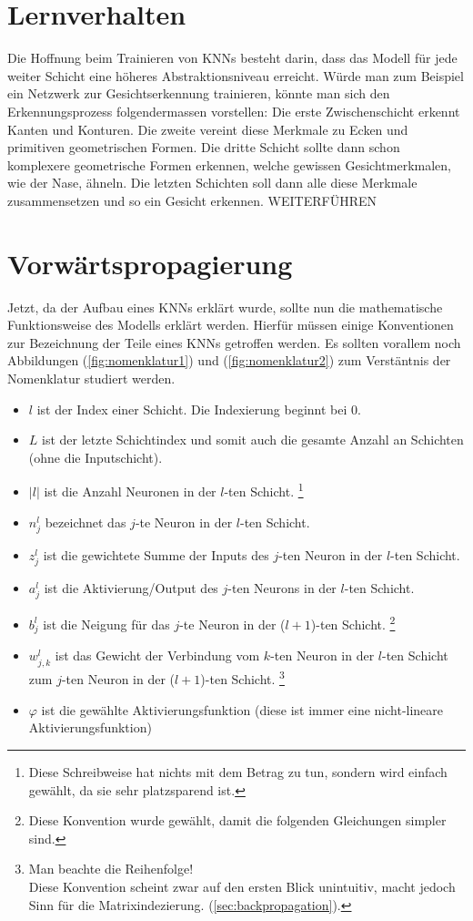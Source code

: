 \section{Lernverhalten}
Die Hoffnung beim Trainieren von KNNs besteht darin, dass das Modell für jede
weiter Schicht eine höheres Abstraktionsniveau erreicht. Würde man zum
Beispiel ein Netzwerk zur Gesichtserkennung trainieren, könnte man sich den
Erkennungsprozess folgendermassen vorstellen: Die erste Zwischenschicht erkennt
Kanten und Konturen. Die zweite vereint diese Merkmale zu Ecken und primitiven
geometrischen Formen. Die dritte Schicht sollte dann schon komplexere
geometrische Formen erkennen, welche gewissen Gesichtmerkmalen, wie der Nase, ähneln. Die letzten Schichten soll dann alle diese
Merkmale zusammensetzen und so ein Gesicht erkennen.
WEITERFÜHREN

\section{Vorwärtspropagierung}
Jetzt, da der Aufbau eines KNNs erklärt wurde, sollte nun die mathematische Funktionsweise
des Modells erklärt werden. Hierfür müssen einige Konventionen zur
Bezeichnung der Teile eines KNNs getroffen werden. Es sollten vorallem noch
Abbildungen (\ref{fig:nomenklatur1}) und (\ref{fig:nomenklatur2}) zum
Verstäntnis der Nomenklatur studiert werden.
\begin{itemize}
\item{$l$ ist der Index einer Schicht. Die Indexierung beginnt bei 0.}
\item{$L$ ist der letzte Schichtindex und somit auch die gesamte Anzahl an
    Schichten (ohne die Inputschicht).}
\item{$|l|$ ist die Anzahl Neuronen in der $l$-ten Schicht.
    \footnote{
      Diese Schreibweise hat nichts mit dem Betrag zu tun, sondern wird einfach
      gewählt, da sie sehr platzsparend ist.
    }
  }
\item{$n_j^l$ bezeichnet das $j$-te Neuron in der $l$-ten Schicht.}
\item{$z_j^l$ ist die gewichtete Summe der Inputs des $j$-ten Neuron in der $l$-ten Schicht.}
\item{$a_j^l$ ist die Aktivierung/Output des $j$-ten Neurons in der $l$-ten Schicht.}
\item{$b_j^l$ ist die Neigung für das $j$-te Neuron in der ($l+1$)-ten Schicht.
    \footnote{
      Diese Konvention wurde gewählt, damit die folgenden Gleichungen simpler sind.
    }
  }
\item{$w_{j,k}^l$ ist das Gewicht der Verbindung vom $k$-ten Neuron
    in der $l$-ten Schicht zum $j$-ten Neuron in der ($l+1$)-ten Schicht.
    \footnote{
      Man beachte die Reihenfolge!\\
      Diese Konvention scheint zwar auf den ersten Blick unintuitiv, macht jedoch
      Sinn für die Matrixindezierung.
      (\ref{sec:backpropagation}).
    }
  }
\item{$\varphi$ ist die gewählte Aktivierungsfunktion (diese ist immer eine
    nicht-lineare Aktivierungsfunktion)}
\end{itemize}

